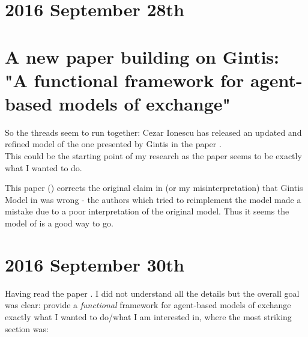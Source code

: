 \section*{2016 September 28th}

\section{A new paper building on Gintis: "A functional framework for agent-based models of exchange" \cite{Botta20114025} }
So the threads seem to run together: Cezar Ionescu has released an updated and refined model of the one presented by Gintis in the paper \cite{Botta20114025}. \\
This could be the starting point of my research as the paper seems to be exactly what I wanted to do. 

\bigskip

This paper (\cite{Botta20114025}) corrects the original claim in \cite{Ionescu2013} (or my misinterpretation) that Gintis Model in \cite{Gintis2006} was wrong - the authors which tried to reimplement the model made a mistake due to a poor interpretation of the original model. Thus it seems the model of \cite{Gintis2006} is a good way to go. 

\section*{2016 September 30th}
Having read the paper \cite{Botta20114025}. I did not understand all the details but the overall goal was clear: provide a \textit{functional} framework for agent-based models of exchange exactly what I wanted to do/what I am interested in, where the most striking section was:

